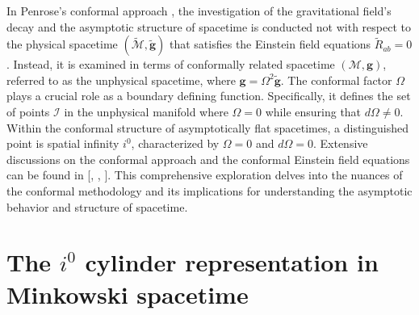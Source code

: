 In Penrose's conformal approach \cite{Pen63}, the investigation of the gravitational field's decay and the asymptotic structure of spacetime is conducted not with respect to the physical spacetime $(\tilde{\mathcal{M}}, \tilde{\boldsymbol{g}})$ that satisfies the Einstein field equations $\tilde{R}_{a b}=0$. Instead, it is examined in terms of conformally related spacetime $(\mathcal{M}, \boldsymbol{g})$, referred to as the unphysical spacetime, where $\boldsymbol{g}=\Omega^2 \tilde{\boldsymbol{g}}$. The conformal factor $\Omega$ plays a crucial role as a boundary defining function. Specifically, it defines the set of points $\mathscr{I}$ in the unphysical manifold where $\Omega = 0$ while ensuring that $d\Omega \neq 0$. \\

Within the conformal structure of asymptotically flat spacetimes, a distinguished point is spatial infinity $i^0$, characterized by $\Omega = 0$ and $d\Omega = 0$. Extensive discussions on the conformal approach and the conformal Einstein field equations can be found in [\cite{Val16}, \cite{Fra04}, \cite{Fri02}]. This comprehensive exploration delves into the nuances of the conformal methodology and its implications for understanding the asymptotic behavior and structure of spacetime.

\section{The $i^0$ cylinder representation in Minkowski  spacetime}
\label{the $i^0$ cylinder}

